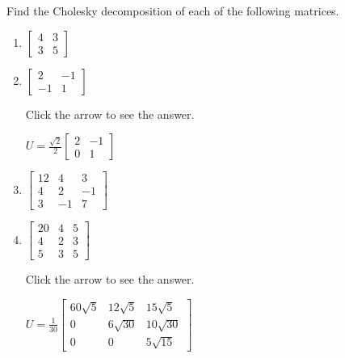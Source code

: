\documentclass{ximera}
\begin{document}
\begin{problem}\label{prob:pos_def_1}
Find the Cholesky decomposition of each of the following matrices.

\begin{enumerate}
\item $\left[ \begin{array}{rr}
4 & 3 \\
3 & 5
\end{array}\right]$

\item $\left[ \begin{array}{rr}
2 & -1 \\
-1 & 1
\end{array}\right]$

Click the arrow to see the answer.
\begin{expandable}
$U = \frac{\sqrt{2}}{2} \left[ \begin{array}{rr}
2 & -1 \\
0 & 1
\end{array}\right]$
\end{expandable}

\item$\left[ \begin{array}{rrr}
12 & 4 & 3 \\
4 & 2 & -1 \\
3 & -1 & 7
\end{array}\right]$

\item $\left[ \begin{array}{rrr}
20 & 4 & 5 \\
4 & 2 & 3 \\
5 & 3 & 5
\end{array}\right]$

Click the arrow to see the answer.
\begin{expandable}
$U = \frac{1}{30} \left[ \begin{array}{ccc}
60\sqrt{5} & 12\sqrt{5} & 15\sqrt{5} \\
0 & 6\sqrt{30} & 10\sqrt{30} \\
0 & 0 & 5\sqrt{15}
\end{array}\right]$
\end{expandable}

\end{enumerate}

\end{problem}
\end{document}
